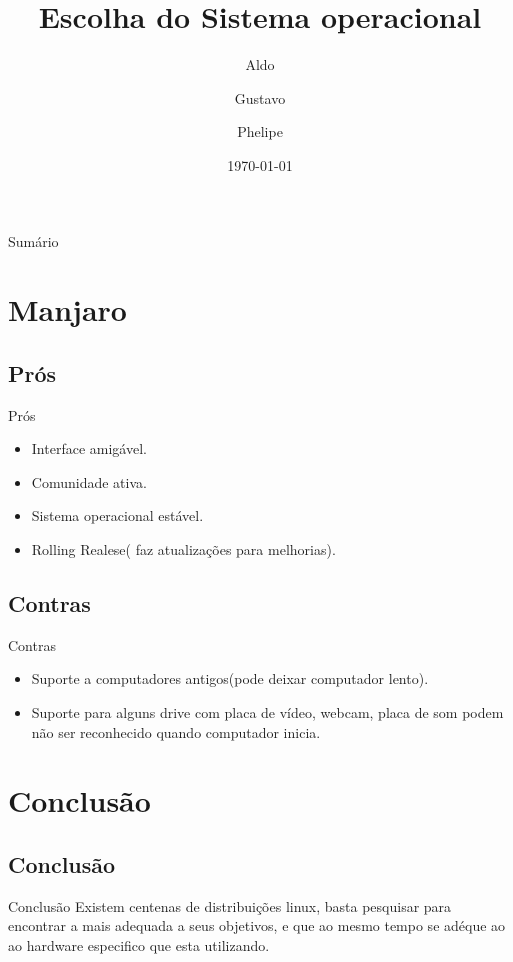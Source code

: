 \documentclass{beamer}
\title{Escolha do Sistema operacional}
\author[ALDO-GUSTAVO-PHELIPE]{Aldo \and Gustavo \and Phelipe}
\date{\today}
\begin{document}


\frame{\titlepage}
\section[Sumário]{}

\begin{frame}{Sumário}
\tableofcontents
\end{frame}


\section{Manjaro}
\subsection{Prós}
\begin{frame}{Prós}
\begin{itemize}
\item <1->Interface amigável.
\item <2->Comunidade ativa.
\item <3->Sistema operacional estável.
\item <4->Rolling Realese( faz atualizações para melhorias).

\end{itemize}
\end{frame}

\subsection{Contras}
\begin{frame}{Contras}
\begin{itemize}
\item <1->Suporte a computadores antigos(pode deixar computador lento).
\item <2->Suporte para alguns drive com placa de vídeo, webcam, placa de som podem não ser reconhecido quando computador inicia.




\end{itemize}
\end{frame}



\section{Conclusão}
\subsection{Conclusão}
\begin{frame}{Conclusão}
Existem centenas de distribuições linux, basta  pesquisar para encontrar a mais adequada a seus objetivos, e que ao mesmo tempo se adéque ao ao hardware especifico que esta utilizando.

\end{frame}
\end{document}

